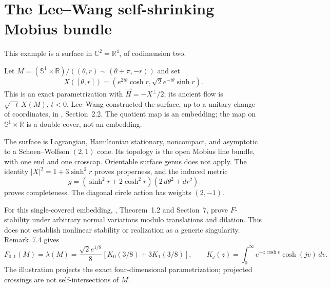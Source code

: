 \chapter{The Lee--Wang self-shrinking Mobius bundle}\label{sec:catalogue-mobius-shrinker}
This example is a surface in $\mathbb C^2=\mathbb R^4$, of codimension two.
\begin{example}\label{ex:catalogue-mobius-shrinker}
Let $M=(\mathbb S^1\times\mathbb R)/((\theta,r)\sim(\theta+\pi,-r))$ and set
\[
 X([\theta,r])=(e^{2i\theta}\cosh r,\sqrt2 e^{-i\theta}\sinh r).
\]
This is an exact parametrization with $\vec H=-X^\perp/2$; its ancient flow is $\sqrt{-t}\,X(M)$, $t<0$.
Lee--Wang constructed the surface, up to a unitary change of coordinates, in \cite{CatLeeWang2009}, Section~2.2. The quotient map is an embedding; the map on $\mathbb S^1\times\mathbb R$ is a double cover, not an embedding.

The surface is Lagrangian, Hamiltonian stationary, noncompact, and asymptotic to a Schoen--Wolfson $(2,1)$ cone. Its topology is the open Mobius line bundle, with one end and one crosscap. Orientable surface genus does not apply. The identity $|X|^2=1+3\sinh^2r$ proves properness, and the induced metric
\[
 g=(\sinh^2r+2\cosh^2r)(2\,d\theta^2+dr^2)
\]
proves completeness. The diagonal circle action has weights $(2,-1)$.

For this single-covered embedding, \cite{CatBraxtonLeeZhu2026}, Theorem~1.2 and Section~7, prove $F$-stability under arbitrary normal variations modulo translations and dilation. This does not establish nonlinear stability or realization as a generic singularity. Remark~7.4 gives
\[
 F_{0,1}(M)=\lambda(M)=\frac{\sqrt2 e^{1/8}}8
 \left[K_0(3/8)+3K_1(3/8)\right],\qquad
 K_j(z)=\int_0^\infty e^{-z\cosh v}\cosh(jv)\,dv.
\]
The illustration projects the exact four-dimensional parametrization; projected crossings are not self-intersections of $M$.
\end{example}

